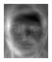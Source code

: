 \begin{frame}
\begin{columns}
\begin{overlayarea}{\textwidth}{\textheight}
{        \begin{minipage}[t]{0.15\textwidth}
          \includegraphics[width=\textwidth]{images/eig_docked_image/eig_5.jpeg}
        \end{minipage}
        \begin{minipage}[t]{0.15\textwidth}

\end{minipage}}
\end{overlayarea}
\end{columns}
\end{frame}

